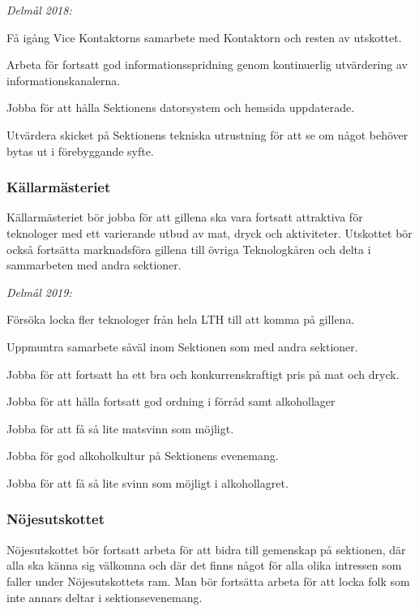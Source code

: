 \documentclass[../_main/handlingar.tex]{subfiles}
\begin{document}
\emph{Delmål 2018:}
\begin{dashlist}
	\item Få igång Vice Kontaktorns samarbete med Kontaktorn och resten av utskottet.
	\item Arbeta för fortsatt god informationsspridning genom kontinuerlig utvärdering av informationskanalerna.
	\item Jobba för att hålla Sektionens datorsystem och hemsida uppdaterade.
	\item Utvärdera skicket på Sektionens tekniska utrustning för att se om något behöver bytas ut i förebyggande syfte.
\end{dashlist}

\subsubsection*{Källarmästeriet}
Källarmästeriet bör jobba för att gillena ska vara fortsatt attraktiva för teknologer med ett varierande utbud av mat, dryck och aktiviteter. Utskottet bör också fortsätta marknadsföra gillena till övriga Teknologkåren och delta i sammarbeten med andra sektioner.

\emph{Delmål 2019:}
\begin{dashlist}
	\item Försöka locka fler teknologer från hela LTH till att komma på gillena.
	\item Uppmuntra samarbete såväl inom Sektionen som med andra sektioner.
	\item Jobba för att fortsatt ha ett bra och konkurrenskraftigt pris på mat och dryck.
	\item Jobba för att hålla fortsatt god ordning i förråd samt alkohollager
	\item Jobba för att få så lite matsvinn som möjligt.
	\item Jobba för god alkoholkultur på Sektionens evenemang.
	\item Jobba för att få så lite svinn som möjligt i alkohollagret.
\end{dashlist}
\newpage
\subsubsection*{Nöjesutskottet}
Nöjesutskottet bör fortsatt arbeta för att bidra till gemenskap på sektionen, där alla ska känna sig välkomna och där det finns något för alla olika intressen som faller under Nöjesutskottets ram. Man bör fortsätta arbeta för att locka folk som inte annars deltar i sektionsevenemang. 
\end{document}
